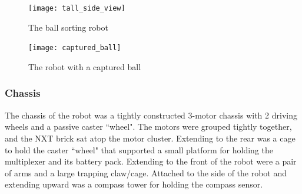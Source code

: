 \documentclass{article}
\begin{document}
\begin{figure}[h!]
  \centering
  \begin{minipage}{.5\textwidth}
    \centering
    \texttt{[image: tall\_side\_view]}
    \caption{The ball sorting robot}
    \label{fig:ball_sorting_robot}
  \end{minipage}%
  \begin{minipage}{.5\textwidth}
    \centering
    \texttt{[image: captured\_ball]}
    \caption{The robot with a captured ball}
    \label{fig:captured_ball}
  \end{minipage}
\end{figure}

\subsubsection{Chassis}
The chassis of the robot was a tightly constructed 3-motor chassis with 2 driving wheels and a passive caster ``wheel". The motors were grouped tightly together, and the NXT brick sat atop the motor cluster. Extending to the rear was a cage to hold the caster ``wheel" that supported a small platform for holding the multiplexer and its battery pack. Extending to the front of the robot were a pair of arms and a large trapping claw/cage. Attached to the side of the robot and extending upward was a compass tower for holding the compass sensor.
\end{document}
